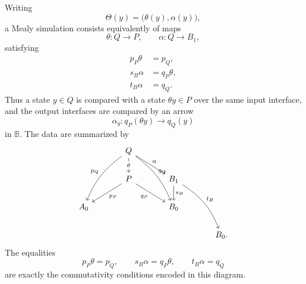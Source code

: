 Writing
\[
    \Theta(y)=\bigl(\theta(y),\alpha(y)\bigr),
\]
a Mealy simulation consists equivalently of maps
\[
    \theta:Q\to P,
    \qquad
    \alpha:Q\to B_1,
\]
satisfying
\begin{align}
    p_P\theta&=p_Q,
    \label{eq:mealy-simulation-input-interface}
    \\
    s_B\alpha&=q_P\theta,
    \label{eq:mealy-simulation-alpha-source}
    \\
    t_B\alpha&=q_Q.
    \label{eq:mealy-simulation-alpha-target}
\end{align}
Thus a state \(y\in Q\) is compared with a state \(\theta y\in P\) over the same input interface, and the output interfaces are compared by an arrow
\[
    \alpha_y:q_P(\theta y)\to q_Q(y)
\]
in \(\mathbb B\). The data are summarized by
\[
    \begin{tikzcd}[column sep=large]
        &
            Q
                \arrow[d, "\theta" description]
                \arrow[ddl, "p_Q"', bend right=15]
                \arrow[ddr, "q_Q", bend left=15]
                \arrow[dr, "\alpha"]
        &
        \\
        &
            P
                \arrow[dl, "p_P"]
                \arrow[dr, "q_P"']
        &
            B_1
                \arrow[d, "s_B"]
                \arrow[ddr, "t_B", bend left=18]
        \\
            A_0
        &
        &
            B_0
        \\
        &
        &
        &
            B_0.
    \end{tikzcd}
\]
The equalities
\[
    p_P\theta=p_Q,
    \qquad
    s_B\alpha=q_P\theta,
    \qquad
    t_B\alpha=q_Q
\]
are exactly the commutativity conditions encoded in this diagram.

